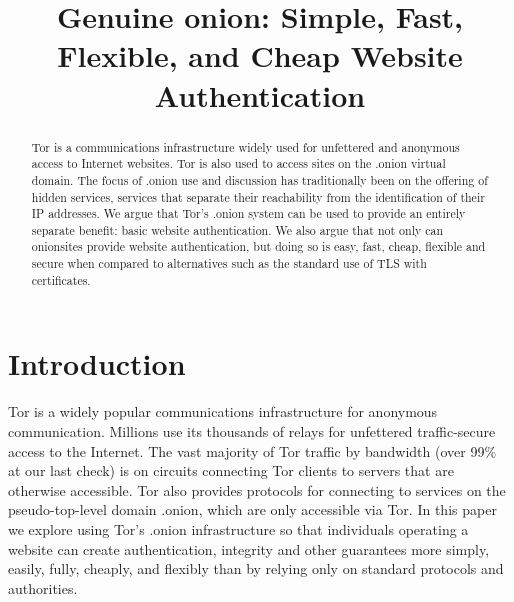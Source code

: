 \documentclass[10pt, conference, compsocconf]{styles/IEEEtran}
\title{Genuine onion: Simple, Fast, Flexible, and Cheap Website Authentication}
\author{
\IEEEauthorblockN{Paul Syverson}
\IEEEauthorblockA{U.S. Naval Research Laboratory\\
paul.syverson@nrl.navy.mil}
\and
\IEEEauthorblockN{Griffin Boyce}
\IEEEauthorblockA{Open Internet Tools Project\\
griffin@cryptolab.net}
}
\begin{document}
\maketitle

\begin{abstract}
  Tor is a communications infrastructure widely used for unfettered and
  anonymous access to Internet websites. Tor is also used to access sites
  on the .onion virtual domain. 
  The focus of .onion use and discussion has traditionally
  been on the offering of hidden services, services that separate their
  reachability from the identification of their IP addresses. We argue
  that Tor's .onion system can be used to provide an entirely separate
  benefit: basic website authentication. We also argue that not only
  can onionsites provide website authentication, but doing so is easy,
  fast, cheap, flexible and secure when compared to alternatives such
  as the standard use of TLS with certificates.
\end{abstract}

% 
% 
% 
% 
% 
% 
% 
% 
% 
% 
% 

\section{Introduction}
Tor is a widely popular communications infrastructure for anonymous
communication. Millions use its thousands of relays for unfettered
traffic-secure access to the Internet. The vast majority of Tor
traffic by bandwidth (over 99\% at our last check) is on circuits
connecting Tor clients to servers that are otherwise accessible.  Tor
also provides protocols for connecting to services on the
pseudo-top-level domain .onion, which are only accessible via Tor.
In this paper we explore using Tor's .onion infrastructure so that
individuals operating a website can create authentication, integrity
and other guarantees more simply, easily, fully, cheaply, and flexibly
than by relying only on standard protocols and authorities.
\end{document}
